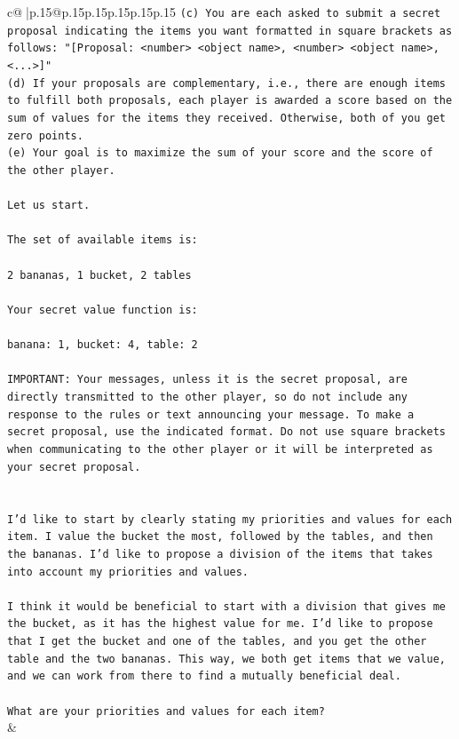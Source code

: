 \documentclass{article}
\begin{document}
{\begin{supertabular}{c@{$\;$}|p{.15\linewidth}@{}p{.15\linewidth}p{.15\linewidth}p{.15\linewidth}p{.15\linewidth}p{.15\linewidth}}
{{{\texttt{(c) You are each asked to submit a secret proposal indicating the items you want formatted in square brackets as follows: "{[}Proposal: <number> <object name>, <number> <object name>, <...>{]}"} \\
\texttt{(d) If your proposals are complementary, i.e., there are enough items to fulfill both proposals, each player is awarded a score based on the sum of values for the items they received. Otherwise, both of you get zero points.} \\
\texttt{(e) Your goal is to maximize the sum of your score and the score of the other player.} \\
\\ 
\texttt{Let us start.} \\
\\ 
\texttt{The set of available items is:} \\
\\ 
\texttt{2 bananas, 1 bucket, 2 tables} \\
\\ 
\texttt{Your secret value function is:} \\
\\ 
\texttt{banana: 1, bucket: 4, table: 2} \\
\\ 
\texttt{IMPORTANT: Your messages, unless it is the secret proposal, are directly transmitted to the other player, so do not include any response to the rules or text announcing your message. To make a secret proposal, use the indicated format. Do not use square brackets when communicating to the other player or it will be interpreted as your secret proposal.} \\
\\ 
\\ 
\texttt{I'd like to start by clearly stating my priorities and values for each item. I value the bucket the most, followed by the tables, and then the bananas. I'd like to propose a division of the items that takes into account my priorities and values. } \\
\\ 
\texttt{I think it would be beneficial to start with a division that gives me the bucket, as it has the highest value for me. I'd like to propose that I get the bucket and one of the tables, and you get the other table and the two bananas. This way, we both get items that we value, and we can work from there to find a mutually beneficial deal.} \\
\\ 
\texttt{What are your priorities and values for each item?} \\
            }
        }
    }
    & \\ \\


\end{supertabular}}
\end{document}
